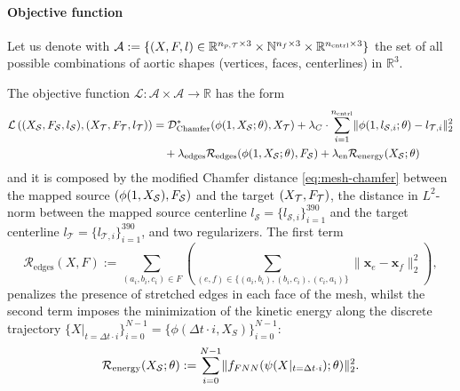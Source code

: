 \paragraph{Objective function} 
Let us denote with $\mathcal A:=\{(X, F, l)\in\mathbb{R}^{n_{p,\mathcal T} \times 3}\times\mathbb{N}^{n_f\times 3}\times\mathbb{R}^{n_{\text{cntrl}}\times 3}\}$ the set of all possible combinations of aortic shapes (vertices, faces, centerlines) in $\mathbb R^3$.

The objective function $\mathcal{L}:\mathcal{A}\times\mathcal{A}\rightarrow\mathbb{R}$ has the form
\begin{equation}\label{eq:L_AA}
\begin{aligned}
  \mathcal{L}\left((X_{\mathcal S},F_{\mathcal S}, l_{\mathcal S}),(X_{\mathcal T},F_{\mathcal T}, l_{\mathcal T})\right)  & = 
  \mathcal{D}_{\text{Chamfer}}^*(\phi(1, X_{\mathcal S}; \theta), X_{\mathcal T}) + \lambda_C\cdot\sum_{i=1}^{n_{\text{cntrl}}}\lVert \phi(1, l_{\mathcal S, i}; \theta)-l_{\mathcal T, i} \rVert^2_2 \\
  & \quad + 
\lambda_{\text{edges}}  \mathcal{R}_{\text{edges}}(\phi(1, X_{\mathcal S}; \theta),F_{\mathcal S}) +  \lambda_{\text{en}} \mathcal{R}_{\text{energy}}(X_{\mathcal S}; \theta)
\end{aligned}
\end{equation}
and it is composed by the modified Chamfer distance \eqref{eq:mesh-chamfer}
between the mapped source $(\phi(1, X_{\mathcal S}),F_{\mathcal S})$ and the target $(X_{\mathcal T},F_{\mathcal T})$, 
the distance in $L^2$-norm between the mapped source centerline $l_{\mathcal{S}}=\{l_{\mathcal{S}, i}\}_{i=1}^{390}$ and the target centerline $l_{\mathcal{T}}=\{l_{\mathcal{T}, i}\}_{i=1}^{390}$, and 
two regularizers.
The first term %
%
\begin{equation*}
  \mathcal{R}_{\text{edges}}\left(X,F\right) := 
  \sum_{(a_i,b_i,c_i) \in F} \left(
  \sum_{(e,f) \in \{(a_i, b_i), (b_i,c_i),(c_i,a_i)\} } \lVert \mathbf x_e - \mathbf x_f \rVert^2_2
   \right),
\end{equation*}
penalizes the presence of stretched edges in each face of the mesh, whilst the second term imposes the minimization of the kinetic energy along the discrete trajectory 
$\{X|_{t=\Delta t\cdot i}\}_{i=0}^{N-1}=\{\phi(\Delta t\cdot i, X_S)\}_{i=0}^{N-1}$:
\begin{equation*}
  \mathcal{R}_{\text{energy}}(X_{\mathcal S}; \theta) := \sum_{i=0}^{N-1} \lVert f_{FNN}(\psi(X|_{t=\Delta t\cdot i});\theta)\rVert^2_2.
\end{equation*}

